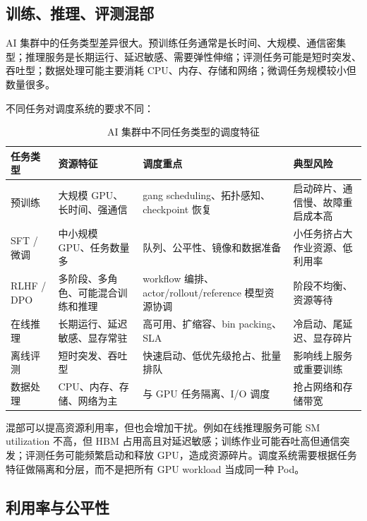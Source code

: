 \subsection{训练、推理、评测混部}
\label{subsec:training-serving-eval-colocation}

AI 集群中的任务类型差异很大。预训练任务通常是长时间、大规模、通信密集型；推理服务是长期运行、延迟敏感、需要弹性伸缩；评测任务可能是短时突发、吞吐型；数据处理可能主要消耗 CPU、内存、存储和网络；微调任务规模较小但数量很多。

不同任务对调度系统的要求不同：

\begin{table}[H]
  \centering
  \caption{AI 集群中不同任务类型的调度特征}
  \label{tab:ai-workload-scheduling-characteristics}
  \begin{tabular}{p{2.8cm}p{3.5cm}p{4.2cm}p{4.0cm}}
    \toprule
    任务类型 & 资源特征 & 调度重点 & 典型风险 \\
    \midrule
    预训练 & 大规模 GPU、长时间、强通信 & gang scheduling、拓扑感知、checkpoint 恢复 & 启动碎片、通信慢、故障重启成本高 \\
    SFT / 微调 & 中小规模 GPU、任务数量多 & 队列、公平性、镜像和数据准备 & 小任务挤占大作业资源、低利用率 \\
    RLHF / DPO & 多阶段、多角色、可能混合训练和推理 & workflow 编排、actor/rollout/reference 模型资源协调 & 阶段不均衡、资源等待 \\
    在线推理 & 长期运行、延迟敏感、显存常驻 & 高可用、扩缩容、bin packing、SLA & 冷启动、尾延迟、显存碎片 \\
    离线评测 & 短时突发、吞吐型 & 快速启动、低优先级抢占、批量排队 & 影响线上服务或重要训练 \\
    数据处理 & CPU、内存、存储、网络为主 & 与 GPU 任务隔离、I/O 调度 & 抢占网络和存储带宽 \\
    \bottomrule
  \end{tabular}
\end{table}

混部可以提高资源利用率，但也会增加干扰。例如在线推理服务可能 SM utilization 不高，但 HBM 占用高且对延迟敏感；训练作业可能吞吐高但通信突发；评测任务可能频繁启动和释放 GPU，造成资源碎片。调度系统需要根据任务特征做隔离和分层，而不是把所有 GPU workload 当成同一种 Pod。

\subsection{利用率与公平性}
\label{subsec:utilization-and-fairness}

